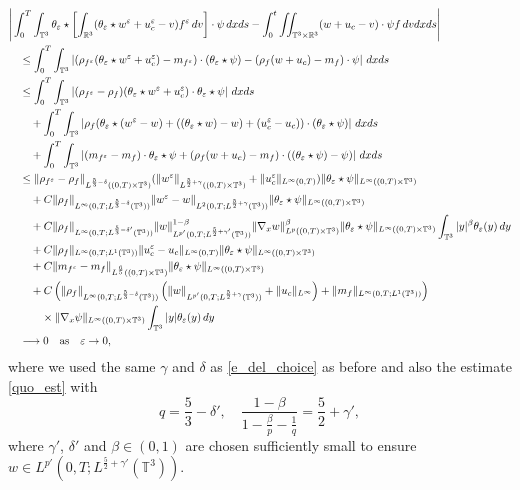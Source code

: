 \documentclass[10pt,reqno]{amsart}
\numberwithin{equation}{section}
\newcommand{\R}{\mathbb R}
\newcommand{\T}{\mathbb T}
\newcommand{\e}{\varepsilon}
\newcommand{\lt}{\left}
\newcommand{\rt}{\right}
\newcommand{\intt}{\int_{\T^3}}
\newcommand{\intr}{\int_{\R^3}}
\newcommand{\inttr}{\iint_{\T^3 \times \R^3}}
\begin{document}
\begin{align*}
&\Bigg|\int_0^T\intt \theta_\e \star\lt[\intr (\theta_\e \star w^\e + u_c^\e-v) f^\e\,dv\rt] \cdot \psi \,dxds -\int_0^t\inttr (w+u_c-v)\cdot \psi f\,dvdxds\Bigg|\\
&\quad \le \int_0^T \intt \lt|(\rho_{f^\e} (\theta_\e \star w^\e + u_c^\e) -m_{f^\e})\cdot (\theta_\e \star \psi) -   (\rho_f ( w + u_c) -m_f)\cdot \psi\rt|\,dxds\\
&\quad \le \int_0^T \intt \lt|(\rho_{f^\e} - \rho_f) (\theta_\e \star w^\e + u_c^\e) \cdot \theta_\e\star \psi\rt|\,dxds\\
&\qquad + \int_0^T \intt \lt| \rho_f (\theta_\e\star(w^\e - w) +((\theta_\e\star w) - w)+ (u_c^\e- u_c) )\cdot (\theta_\e\star\psi) \rt|\,dxds\\
&\qquad + \int_0^T \intt \lt|(m_{f^\e} - m_f )\cdot \theta_\e\star\psi +(\rho_f ( w +u_c) - m_f)\cdot ((\theta_\e\star\psi)-\psi)  \rt|\,dxds\\
&\quad \le \|\rho_{f^\e} - \rho_f\|_{L^{\frac 53-\delta}((0,T)\times\T^3)}(\|w^\e\|_{L^{\frac52 +\gamma}((0,T)\times\T^3)} + \|u_c^\e\|_{L^\infty(0,T)})\|\theta_\e\star \psi\|_{L^\infty((0,T)\times\T^3)}\\
&\qquad+ C\|\rho_f\|_{L^\infty(0,T;L^{\frac 53- \delta}(\T^3))}\|w^\e - w\|_{L^2(0,T;L^{\frac52 + \gamma}(\T^3))}\|\theta_\e\star\psi\|_{L^\infty((0,T)\times\T^3)}\\
&\qquad + C \|\rho_f\|_{L^\infty(0,T;L^{\frac 53-\delta'}(\T^3))}\|w\|_{L^{p'}(0,T;L^{\frac 52 +\gamma'}(\T^3))}^{1-\beta}\|\nabla_x w\|_{L^p((0,T)\times \T^3)}^\beta\|\theta_\e\star\psi\|_{L^\infty((0,T)\times\T^3)}\intt |y|^\beta \theta_\e(y)\,dy\\
&\qquad +C\|\rho_f\|_{L^\infty(0,T;L^1(\T^3))}\|u_c^\e - u_c\|_{L^\infty(0,T)}\|\theta_\e\star\psi\|_{L^\infty((0,T)\times\T^3)}\\
&\qquad + C\|m_{f^\e} -m_f\|_{L^{\frac 65}((0,T)\times \T^3)}\|\theta_\e\star\psi\|_{L^\infty((0,T)\times\T^3)}\\
&\qquad + C\lt(\|\rho_f\|_{L^\infty(0,T;L^{\frac 53-\delta}(\T^3))}\lt(\|w\|_{L^{p'}(0,T;L^{\frac 52+\gamma}(\T^3))} +\|u_c\|_{L^\infty}\rt) + \|m_f\|_{L^\infty(0,T;L^1(\T^3))}\rt) \cr
&\qquad \quad \times \|\nabla_x \psi\|_{L^\infty((0,T)\times\T^3)}\intt |y|\theta_\e(y)\,dy\\
&\quad \longrightarrow 0 \quad \mbox{as} \quad \e \to 0,
\end{align*}
where we used the same $\gamma$ and $\delta$ as \eqref{e_del_choice} as before and also the estimate \eqref{quo_est} with
\[
q= \frac 53 - \delta', \quad \frac{1-\beta}{1-\frac \beta p -\frac 1q} = \frac 52 + \gamma',
\]
where $\gamma'$, $\delta'$ and $\beta\in(0,1)$ are chosen sufficiently small to ensure $w \in L^{p'}(0,T;L^{\frac 52+\gamma'}(\T^3))$.
\end{document}

